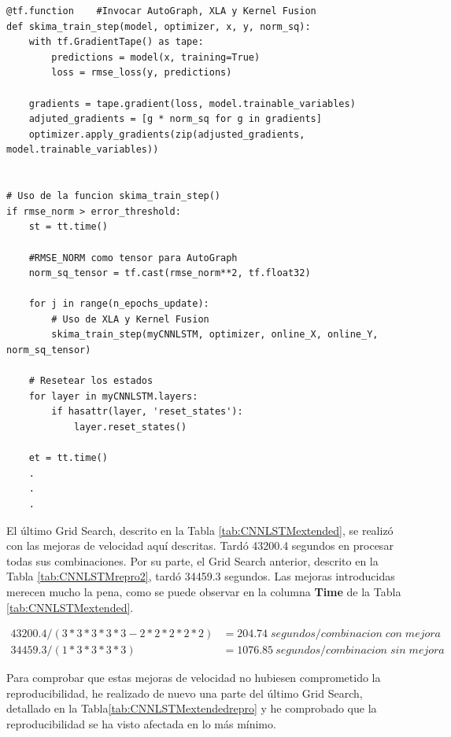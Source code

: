 \documentclass{article}
\begin{document}
\begin{lstlisting}[style=pythonstyle, caption={Uso de \texttt{AutoGraph}, \texttt{XLA} y \texttt{Kernel Fusion} mediante \texttt{@tf.function}}]
@tf.function	#Invocar AutoGraph, XLA y Kernel Fusion
def skima_train_step(model, optimizer, x, y, norm_sq):
	with tf.GradientTape() as tape:
		predictions = model(x, training=True)
		loss = rmse_loss(y, predictions)

	gradients = tape.gradient(loss, model.trainable_variables)
	adjuted_gradients = [g * norm_sq for g in gradients]
	optimizer.apply_gradients(zip(adjusted_gradients, model.trainable_variables))


# Uso de la funcion skima_train_step()
if rmse_norm > error_threshold:
	st = tt.time()

	#RMSE_NORM como tensor para AutoGraph
	norm_sq_tensor = tf.cast(rmse_norm**2, tf.float32)

	for j in range(n_epochs_update):
		# Uso de XLA y Kernel Fusion
		skima_train_step(myCNNLSTM, optimizer, online_X, online_Y, norm_sq_tensor)

	# Resetear los estados
	for layer in myCNNLSTM.layers:
		if hasattr(layer, 'reset_states'):
			layer.reset_states()

	et = tt.time()
	.
	.
	.
\end{lstlisting}
\FloatBarrier

El último Grid Search, descrito en la Tabla \ref{tab:CNNLSTMextended}, se realizó con las mejoras de velocidad aquí descritas. Tardó 43200.4 segundos en procesar todas sus combinaciones. Por su parte, el Grid Search anterior, descrito en la Tabla \ref{tab:CNNLSTMrepro2}, tardó 34459.3 segundos. Las mejoras introducidas merecen mucho la pena, como se puede observar en la columna \textbf{Time} de la Tabla \ref{tab:CNNLSTMextended}.

\begin{align*}
	43200.4/(3*3*3*3*3-2*2*2*2*2)&=204.74 \; segundos/combinacion \; con \; mejora\\
	34459.3/(1*3*3*3*3)&=1076.85 \: segundos/combinacion \; sin \; mejora
\end{align*}

Para comprobar que estas mejoras de velocidad no hubiesen comprometido la reproducibilidad, he realizado de nuevo una parte del último Grid Search, detallado en la Tabla\ref{tab:CNNLSTMextendedrepro} y he comprobado que la reproducibilidad se ha visto afectada en lo más mínimo.
\end{document}
